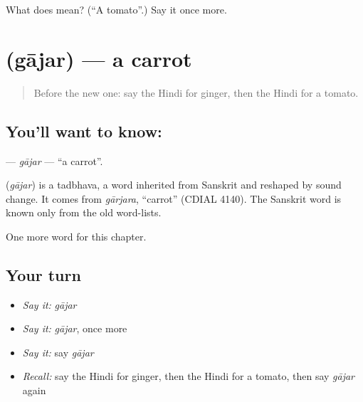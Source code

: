 \begin{tcolorbox}[breakable,colback=teal!4,colframe=teal!35!black,title={Before you move on}]
What does  mean? (\textquotedblleft{}A tomato\textquotedblright{}.) Say it once more.
\end{tcolorbox}
\section[\texorpdfstring{\hi{गाजर} (gājar)}{गाजर (gājar)}]{ (gājar) — a carrot}

\label{lesson:HI-C138-gajar}



\begin{quote}
Before the new one: say the Hindi for ginger, then the Hindi for a tomato.
\end{quote}

\subsection*{You'll want to know: }
\textbf{} — \emph{gājar} — \textquotedblleft{}a carrot\textquotedblright{}.

\begin{cousinweb}
\textbf{} (\emph{gājar}) is a tadbhava, a word inherited from Sanskrit and reshaped by sound change. It comes from \emph{gārjara}, \textquotedblleft{}carrot\textquotedblright{} (CDIAL 4140). The Sanskrit word is known only from the old word-lists.
\end{cousinweb}

\begin{grammarlens}[title={What you've built}]
One more word for this chapter.
\end{grammarlens}

\subsection*{Your turn}
\begin{itemize}
\raggedright
  \item \emph{Say it:} \emph{gājar}
  \item \emph{Say it:} \emph{gājar}, once more
  \item \emph{Say it:} say \emph{gājar}
  \item \emph{Recall:} say the Hindi for ginger, then the Hindi for a tomato, then say \emph{gājar} again
\end{itemize}

